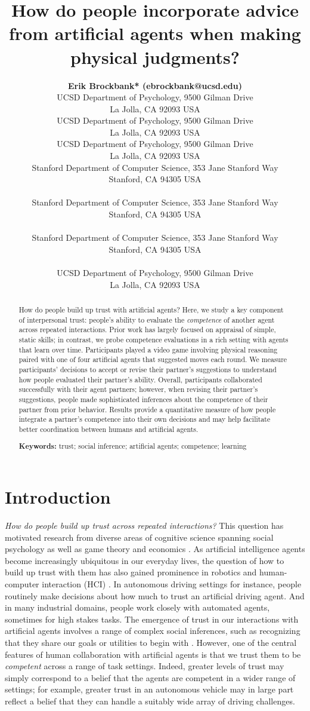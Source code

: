 \documentclass[10pt,letterpaper]{article}
\title{How do people incorporate advice from artificial agents when making physical judgments?}
\author{
  {
  \large \bf Erik Brockbank* (ebrockbank@ucsd.edu)} \\
  UCSD Department of Psychology, 9500 Gilman Drive \\
  La Jolla, CA 92093 USA
  \AND {\large \bf Haoliang Wang* (haw027@ucsd.edu)} \\
  UCSD Department of Psychology, 9500 Gilman Drive \\
  La Jolla, CA 92093 USA
  \AND {\large \bf Justin Yang (juy003@ucsd.edu)} \\
  UCSD Department of Psychology, 9500 Gilman Drive \\
  La Jolla, CA 92093 USA
  \AND {\large \bf Suvir Mirchandani (suvir@cs.stanford.edu)} \\
  Stanford Department of Computer Science, 353 Jane Stanford Way \\
  Stanford, CA 94305 USA \\
  \AND {\large \bf Erdem Biyik (ebiyik@stanford.edu)} \\
  Stanford Department of Computer Science, 353 Jane Stanford Way \\
  Stanford, CA 94305 USA \\
  \AND {\large \bf Dorsa Sadigh (dorsa@cs.stanford.edu)} \\
  Stanford Department of Computer Science, 353 Jane Stanford Way \\
  Stanford, CA 94305 USA \\
  \AND {\large \bf Judith Fan (jefan@ucsd.edu)} \\
  UCSD Department of Psychology, 9500 Gilman Drive \\
  La Jolla, CA 92093 USA \\
}
\begin{document}
\maketitle


\begin{abstract}
How do people build up trust with artificial agents? Here, we study a key component of interpersonal trust: people's ability to evaluate the \textit{competence} of another agent across repeated interactions. Prior work has largely focused on appraisal of simple, static skills; in contrast, we probe competence evaluations in a rich setting with agents that learn over time. Participants played a video game involving physical reasoning paired with one of four artificial agents that suggested moves each round. We measure participants' decisions to accept or revise their partner's suggestions to understand how people evaluated their partner's ability. Overall, participants collaborated successfully with their agent partners; however, when revising their partner's suggestions, people made sophisticated inferences about the competence of their partner from prior behavior. Results provide a quantitative measure of how people integrate a partner's competence into their own decisions and may help facilitate better coordination between humans and artificial agents.

\textbf{Keywords:} 
trust; social inference; artificial agents; competence; learning 
\end{abstract}



\section{Introduction}

\textit{How do people build up trust across repeated interactions?} This question has motivated research from diverse areas of cognitive science spanning social psychology \cite{simpson2007psychological, deutsch1973resolution} as well as game theory and economics \cite{camerer1988experimental, berg1995trust}. As artificial intelligence agents become increasingly ubiquitous in our everyday lives, the question of how to build up trust with them has also gained prominence in robotics and human-computer interaction (HCI) \cite{soh2020multi, chen2020trust}. 
In autonomous driving settings for instance, people routinely make decisions about how much to trust an artificial driving agent. And in many industrial domains, people work closely with automated agents, sometimes for high stakes tasks. The emergence of trust in our interactions with artificial agents involves a range of complex social inferences, such as recognizing that they share our goals or utilities to begin with \cite{serrino2019finding}. However, one of the central features of human collaboration with artificial agents is that we trust them to be \textit{competent} across a range of task settings. Indeed, greater levels of trust may simply correspond to a belief that the agents are competent in a wider range of settings; for example, greater trust in an autonomous vehicle may in large part reflect a belief that they can handle a suitably wide array of driving challenges.
\end{document}
